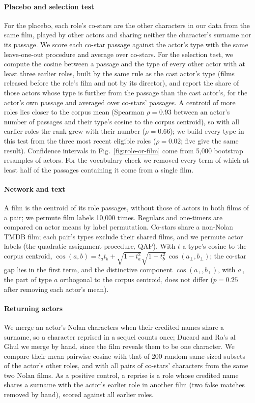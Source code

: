 \documentclass[9pt,twocolumn,twoside]{pnas-new}
\begin{document}
{\paragraph*{Placebo and selection test} For the placebo, each role's co-stars are the other characters in our data from the same film, played by other actors and sharing neither the character's surname nor its passage. We score each co-star passage against the actor's type with the same leave-one-out procedure and average over co-stars. For the selection test, we compute the cosine between a passage and the type of every other actor with at least three earlier roles, built by the same rule as the cast actor's type (films released before the role's film and not by its director), and report the share of those actors whose type is further from the passage than the cast actor's, for the actor's own passage and averaged over co-stars' passages. A centroid of more roles lies closer to the corpus mean (Spearman $\rho = 0.93$ between an actor's number of passages and their type's cosine to the corpus centroid), so with all earlier roles the rank grew with their number ($\rho = 0.66$); we build every type in this test from the three most recent eligible roles ($\rho = 0.02$; five give the same result). Confidence intervals in Fig.~\ref{fig:role-or-film} come from 5{,}000 bootstrap resamples of actors. For the vocabulary check we removed every term of which at least half of the passages containing it come from a single film.

\paragraph*{Network and text} A film is the centroid of its role passages, without those of actors in both films of a pair; we permute film labels 10{,}000 times. Regulars and one-timers are compared on actor means by label permutation. Co-stars share a non-Nolan TMDB film; each pair's types exclude their shared films, and we permute actor labels (the quadratic assignment procedure, QAP). With $t$ a type's cosine to the corpus centroid, $\cos(a, b) = t_a t_b + \sqrt{1 - t_a^2}\sqrt{1 - t_b^2}\,\cos(a_\perp, b_\perp)$; the co-star gap lies in the first term, and the distinctive component $\cos(a_\perp, b_\perp)$, with $a_\perp$ the part of type $a$ orthogonal to the corpus centroid, does not differ ($p = 0.25$ after removing each actor's mean).

\paragraph*{Returning actors} We merge an actor's Nolan characters when their credited names share a surname, so a character reprised in a sequel counts once; Ducard and Ra's al Ghul we merge by hand, since the film reveals them to be one character. We compare their mean pairwise cosine with that of 200 random same-sized subsets of the actor's other roles, and with all pairs of co-stars' characters from the same two Nolan films. As a positive control, a reprise is a role whose credited name shares a surname with the actor's earlier role in another film (two false matches removed by hand), scored against all earlier roles.

}
\end{document}
